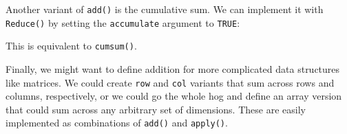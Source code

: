 \begin{Shaded}
\begin{Highlighting}[]
\NormalTok{(}\NormalTok{:}\NormalTok{, }\NormalTok{:}\NormalTok{)}
\NormalTok{(}\NormalTok{(), }\NormalTok{())}
\NormalTok{(}\NormalTok{(}\NormalTok{, }\NormalTok{), }\NormalTok{(}\NormalTok{, }\NormalTok{))}
\NormalTok{(}\NormalTok{(}\NormalTok{, }\NormalTok{), }\NormalTok{(}\NormalTok{, }\NormalTok{), } \NormalTok{)}
\end{Highlighting}
\end{Shaded}

Another variant of \texttt{add()} is the cumulative sum. We can
implement it with \texttt{Reduce()} by setting the \texttt{accumulate}
argument to \texttt{TRUE}:

\begin{Shaded}
\begin{Highlighting}[]
\StringTok{ } \NormalTok{) \{}
   
     \NormalTok{)}
\NormalTok{\}}
\NormalTok{(}\NormalTok{:}\NormalTok{)}
\NormalTok{(}\NormalTok{:}\NormalTok{)}
\end{Highlighting}
\end{Shaded}

This is equivalent to \texttt{cumsum()}.

Finally, we might want to define addition for more complicated data
structures like matrices. We could create \texttt{row} and \texttt{col}
variants that sum across rows and columns, respectively, or we could go
the whole hog and define an array version that could sum across any
arbitrary set of dimensions. These are easily implemented as
combinations of \texttt{add()} and \texttt{apply()}.

